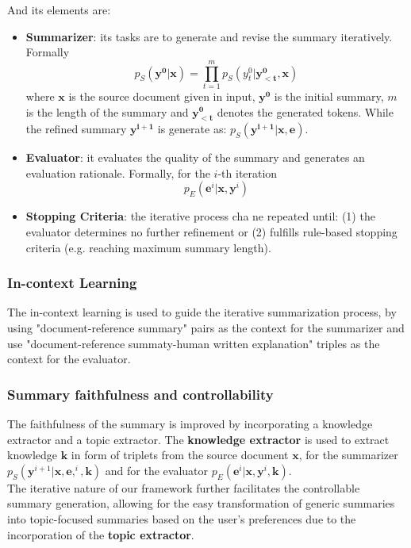 \documentclass[12pt]{article}
\begin{document}
And its elements are:
\begin{itemize}
    \item \textbf{Summarizer}: its tasks are to generate and revise the summary iteratively. Formally 
    \begin{equation}
        p_S(\boldsymbol{y^0} | \boldsymbol{x}) = \prod_{t=1}^{m} p_S(y_t^0 | \boldsymbol{y_{<t}^0}, \boldsymbol{x})
    \end{equation}
    where $\boldsymbol{x}$ is the source document given in input, $\boldsymbol{y^0}$ is the initial summary, $m$ is the length of the summary and $\boldsymbol{y_{<t}^0}$ denotes the generated tokens.
    While the refined summary $\boldsymbol{y^{i+1}}$ is generate as: $p_S(\boldsymbol{y^{i+1}} | \boldsymbol{x}, \boldsymbol{e})$.
    \item \textbf{Evaluator}: it evaluates the quality of the summary and generates an evaluation rationale. Formally, for the $i$-th iteration
    \begin{equation}
        p_E(\boldsymbol{e}^i | \boldsymbol{x}, \boldsymbol{y}^{i}) 
    \end{equation}
    \item \textbf{Stopping Criteria}: the iterative process cha ne repeated until: (1) the evaluator determines no further refinement or (2) fulfills rule-based stopping criteria (e.g. reaching maximum summary length).
\end{itemize}

\subsubsection{In-context Learning}
\label{subsubsec:SummIt_in_context_learning}

The in-context learning  is used to guide the iterative summarization process, by using "document-reference summary" pairs as the context for the summarizer and use "document-reference summaty-human written explanation" triples as the context for the evaluator.  

\subsubsection{Summary faithfulness and controllability}
\label{subsubsec:SummIt_faithfulness_controllability}

The faithfulness of the summary is improved by incorporating a knowledge extractor and a topic extractor. The \textbf{knowledge extractor} is used to extract knowledge $\boldsymbol{k}$ in form of triplets from the source document $\boldsymbol{x}$, for the summarizer $p_S(\boldsymbol{y}^{i+1} | \boldsymbol{x}, \boldsymbol{e}, ^i, \boldsymbol{k})$ and for the evaluator $p_E(\boldsymbol{e}^{i} | \boldsymbol{x}, \boldsymbol{y}^{i}, \boldsymbol{k})$. \\
The iterative nature of our framework further facilitates the controllable summary generation, allowing for the easy transformation of generic summaries into topic-focused summaries based on the user’s preferences due to the incorporation of the \textbf{topic extractor}.
\end{document}
